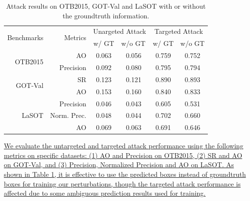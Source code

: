 \documentclass[12pt]{article}
\begin{document}
\begin{table}[t]
  \renewcommand\thetable{X}
  \centering
  \caption{Attack results on OTB2015, GOT-Val and LaSOT with or without the groundtruth information.%
  }
  \begin{tabular}{rrcccc}
  \toprule
  \multirow{2}{*}[-2pt]{Benchmarks} & \multirow{2}{*}[-2pt]{Metrics} & \multicolumn{2}{c}{Unargeted Attack} & \multicolumn{2}{c}{Targeted Attack} \\ \cmidrule{3-6}
                              &                          & w/ GT  & \multicolumn{1}{l}{w/o GT}  & w/ GT  & \multicolumn{1}{l}{w/o GT} \\ \midrule
  \multirow{2}{*}{OTB2015}     & AO                       & 0.063  & 0.056                       & 0.759  & 0.752                      \\
                              & Precision                & 0.092  & 0.080                       & 0.795  & 0.794                      \\ \midrule
  \multirow{2}{*}{GOT-Val}    & SR                       & 0.123  & 0.121                       & 0.890  & 0.893                      \\
                              & AO                       & 0.153  & 0.160                       & 0.840  & 0.833                      \\ \midrule
  \multirow{3}{*}{LaSOT}      & Precision                & 0.046  & 0.043                       & 0.605  & 0.531                      \\
                              & Norm. Prec.              & 0.048  & 0.044                       & 0.702  & 0.660                      \\
                              & AO                       & 0.069  & 0.063                       & 0.691  & 0.646                      \\ \bottomrule
  \end{tabular}
  \label{tab:agent_GT}
\end{table}

\uline{We evaluate the untargeted and targeted attack performance using the following metrics on specific datasets: (1) AO and Precision on OTB2015, (2) SR and AO on GOT-Val, and (3) Precision, Normalized Precision and AO on LaSOT. As shown in Table \ref{tab:agent_GT}, it is effective to use the predicted boxes instead of groundtruth boxes for training our perturbations, though the targeted attack performance is affected due to some ambiguous prediction results used for training.}
\end{document}
